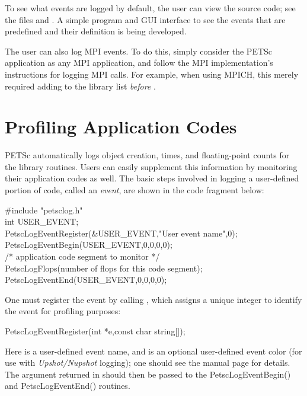 {{To see what events are logged by default, the user can view the source code; see
the files  and .  A simple program and
GUI interface to see the events that are predefined and their definition is 
being developed.

The user can also log MPI events.  To do this, simply consider the
PETSc application as any MPI application, and follow the MPI
implementation's instructions for logging MPI calls. For example, when
using MPICH, this merely required adding  to the library
list {\em before} .

\section{Profiling Application Codes}
\label{sec_profileuser}

PETSc automatically logs object creation, times, and floating-point
counts for the library routines. Users can easily supplement
this information by monitoring their application codes as well.  
The basic steps involved in logging a
user-defined portion of code, called an {\em event}, are shown in the 
code fragment below:
\begin{tabbing}
    \#include "petsclog.h"\\
    int USER\_EVENT;\\
    PetscLogEventRegister(\&USER\_EVENT,"User event name",0);\\
    PetscLogEventBegin(USER\_EVENT,0,0,0,0);\\
       /* application code segment to monitor */\\
       PetscLogFlops(number of flops for this code segment);\\
    PetscLogEventEnd(USER\_EVENT,0,0,0,0);
\end{tabbing}

One must register the event by calling , which assigns a unique integer to identify the
event for profiling purposes: 
\begin{tabbing}
  PetscLogEventRegister(int *e,const char string[]);
\end{tabbing}
Here  is a user-defined event name, and  is an
optional user-defined event color (for use with {\em Upshot/Nupshot} logging);
one should see the manual page for details.  The argument returned in  should then
be passed to the PetscLogEventBegin() and PetscLogEventEnd()
routines.

}}
